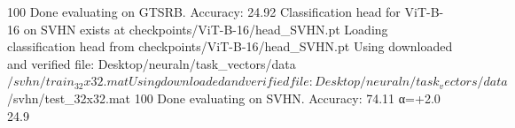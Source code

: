 100%
Done evaluating on GTSRB. Accuracy: 24.92%
Classification head for ViT-B-16 on SVHN exists at checkpoints/ViT-B-16/head_SVHN.pt
Loading classification head from checkpoints/ViT-B-16/head_SVHN.pt
Using downloaded and verified file: Desktop/neuraln/task_vectors/data$/svhn/train_32x32.mat
Using downloaded and verified file: Desktop/neuraln/task_vectors/data$/svhn/test_32x32.mat
100%
Done evaluating on SVHN. Accuracy: 74.11%
  α=+2.0        24.9%

